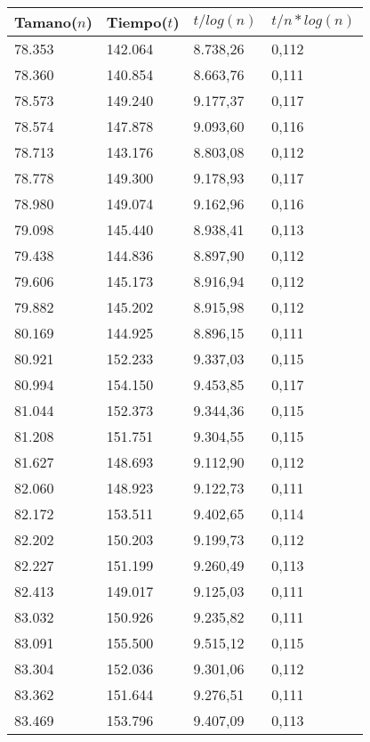 \begin{table}[H]
\parbox{0.3\textwidth}{
  \begin{tabular}{| l | l | l |l |}
    \hline
    Tamano($n$) & Tiempo($t$) & $t / log(n)$ & $t / n*log(n)$ \\ \hline
78.353	&	142.064	&	8.738,26	&	0,112	\\ \hline
78.360	&	140.854	&	8.663,76	&	0,111	\\ \hline
78.573	&	149.240	&	9.177,37	&	0,117	\\ \hline
78.574	&	147.878	&	9.093,60	&	0,116	\\ \hline
78.713	&	143.176	&	8.803,08	&	0,112	\\ \hline
78.778	&	149.300	&	9.178,93	&	0,117	\\ \hline
78.980	&	149.074	&	9.162,96	&	0,116	\\ \hline
79.098	&	145.440	&	8.938,41	&	0,113	\\ \hline
79.438	&	144.836	&	8.897,90	&	0,112	\\ \hline
79.606	&	145.173	&	8.916,94	&	0,112	\\ \hline
79.882	&	145.202	&	8.915,98	&	0,112	\\ \hline
80.169	&	144.925	&	8.896,15	&	0,111	\\ \hline
80.921	&	152.233	&	9.337,03	&	0,115	\\ \hline
80.994	&	154.150	&	9.453,85	&	0,117	\\ \hline
81.044	&	152.373	&	9.344,36	&	0,115	\\ \hline
81.208	&	151.751	&	9.304,55	&	0,115	\\ \hline
81.627	&	148.693	&	9.112,90	&	0,112	\\ \hline
82.060	&	148.923	&	9.122,73	&	0,111	\\ \hline
82.172	&	153.511	&	9.402,65	&	0,114	\\ \hline
82.202	&	150.203	&	9.199,73	&	0,112	\\ \hline
82.227	&	151.199	&	9.260,49	&	0,113	\\ \hline
82.413	&	149.017	&	9.125,03	&	0,111	\\ \hline
83.032	&	150.926	&	9.235,82	&	0,111	\\ \hline
83.091	&	155.500	&	9.515,12	&	0,115	\\ \hline
83.304	&	152.036	&	9.301,06	&	0,112	\\ \hline
83.362	&	151.644	&	9.276,51	&	0,111	\\ \hline
83.469	&	153.796	&	9.407,09	&	0,113	\\ \hline

\end{tabular}}
\end{table}

